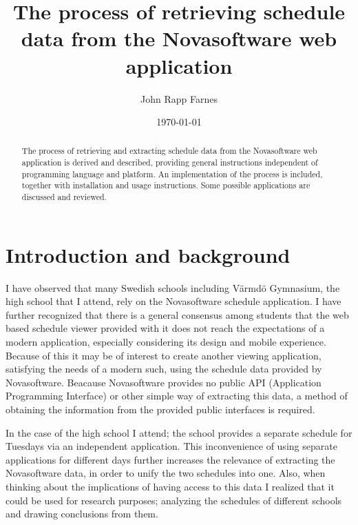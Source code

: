 \documentclass{article}
\begin{document}
	\title{The process of retrieving schedule data from the Novasoftware web application}
	
	\author{John Rapp Farnes}
	
	\date{\today}
	
	\maketitle
	
	\begin{abstract}\noindent
		The process of retrieving and extracting schedule data from the Novasoftware web application is derived and described, providing general instructions independent of programming language and platform. %
		An implementation of the process is included, together with installation and usage instructions. Some possible applications are discussed and reviewed.
	\end{abstract}
	
	\newpage
	
	\tableofcontents
	
	\cleardoublepage
	\pagestyle{plain}
	
	\section{Introduction and background}
	I have observed that many Swedish schools including Värmdö Gymnasium, the high school that I attend, rely on the Novasoftware schedule application. I have further recognized that there is a general consensus among students that the web based schedule viewer provided with it does not reach the expectations of a modern application, especially considering its design and mobile experience. Because of this it may be of interest to create another viewing application, satisfying the needs of a modern such, using the schedule data provided by Novasoftware. Beacause Novasoftware provides no public API (Application Programming Interface) or other simple way of extracting this data, a method of obtaining the information from the provided public interfaces is required.
	
	In the case of the high school I attend; the school provides a separate schedule for Tuesdays via an independent application. This inconvenience of using separate applications for different days further increases the relevance of extracting the Novasoftware data, in order to unify the two schedules into one. Also, when thinking about the implications of having access to this data I realized that it could be used for research purposes; analyzing the schedules of different schools and drawing conclusions from them.
	
\end{document}
